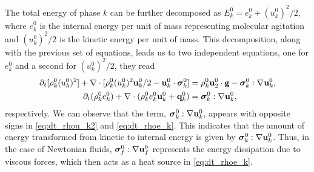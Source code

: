 The total energy of phase $k$ can be further decomposed as $E_k^0 = e_k^0 + (u_k^0)^2/2$, where $e_k^0$ is the internal energy per unit of mass representing molecular agitation and $(u_k^0)^2/2$ is the kinetic energy per unit of mass.
This decomposition, along with the previous set of equations, leads us to two independent equations, one for $e_k^0$ and a second for $(u_k^0)^2/2$, they read
\begin{align}
    \label{eq:dt_rhou_k2}
    \partial_t [\rho_k^0(u_k^0)^2]  
    + \mathbf{\nabla}\cdot [\rho_k^0(u_k^0)^2\textbf{u}_k^0/2 - \textbf{u}_k^0 \cdot \bm{\sigma}_k^0]
    &=
    \rho_k^0\textbf{u}_2^0 \cdot \textbf{g}  
    -  \bm{\sigma}_k^0 : \mathbf{\nabla} \textbf{u}_k^0,
    \\
    \label{eq:dt_rhoe_k}
    \partial_t (\rho_k^0e_k^0)  
    + \mathbf{\nabla}\cdot (
        \rho_k^0e_k^0\textbf{u}_k^0
        + \textbf{q}_k^0
        )
    &= 
    \bm{\sigma}_k^0 : \mathbf{\nabla} \textbf{u}_k^0,
\end{align} 
respectively. 
We can observe that the term, $\bm{\sigma}_k^0 : \mathbf{\nabla} \textbf{u}_k^0$,  appears with opposite signs in \ref{eq:dt_rhou_k2} and \ref{eq:dt_rhoe_k}.
This indicates that the amount of energy transformed from kinetic to internal energy is given by $\bm{\sigma}_k^0 : \mathbf{\nabla} \textbf{u}_k^0$.
Thus, in the case of Newtonian fluids, $\bm{\sigma}_f^0 : \mathbf{\nabla} \textbf{u}_f^0$ represents the energy dissipation due to viscous forces, which then acts as a heat source in \ref{eq:dt_rhoe_k}. 


